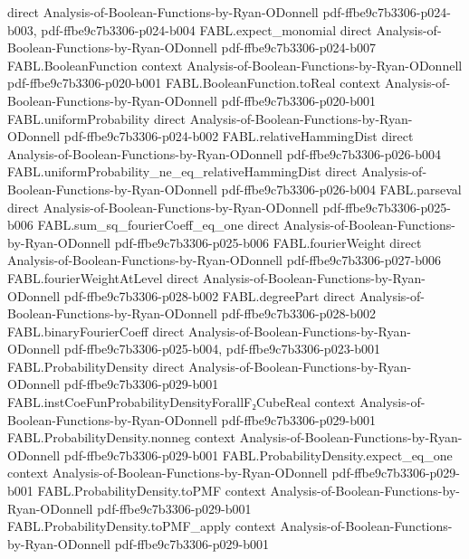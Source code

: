 \begin{theorem}
  {direct}
  {Analysis-of-Boolean-Functions-by-Ryan-ODonnell}
  {pdf-ffbe9c7b3306-p024-b003,
    pdf-ffbe9c7b3306-p024-b004}
\proofstep
  {FABL.expect_monomial}
  {direct}
  {Analysis-of-Boolean-Functions-by-Ryan-ODonnell}
  {pdf-ffbe9c7b3306-p024-b007}
\proofstep
  {FABL.BooleanFunction}
  {context}
  {Analysis-of-Boolean-Functions-by-Ryan-ODonnell}
  {pdf-ffbe9c7b3306-p020-b001}
\proofstep
  {FABL.BooleanFunction.toReal}
  {context}
  {Analysis-of-Boolean-Functions-by-Ryan-ODonnell}
  {pdf-ffbe9c7b3306-p020-b001}
\proofstep
  {FABL.uniformProbability}
  {direct}
  {Analysis-of-Boolean-Functions-by-Ryan-ODonnell}
  {pdf-ffbe9c7b3306-p024-b002}
\proofstep
  {FABL.relativeHammingDist}
  {direct}
  {Analysis-of-Boolean-Functions-by-Ryan-ODonnell}
  {pdf-ffbe9c7b3306-p026-b004}
\proofstep
  {FABL.uniformProbability_ne_eq_relativeHammingDist}
  {direct}
  {Analysis-of-Boolean-Functions-by-Ryan-ODonnell}
  {pdf-ffbe9c7b3306-p026-b004}
\proofstep
  {FABL.parseval}
  {direct}
  {Analysis-of-Boolean-Functions-by-Ryan-ODonnell}
  {pdf-ffbe9c7b3306-p025-b006}
\proofstep
  {FABL.sum_sq_fourierCoeff_eq_one}
  {direct}
  {Analysis-of-Boolean-Functions-by-Ryan-ODonnell}
  {pdf-ffbe9c7b3306-p025-b006}
\proofstep
  {FABL.fourierWeight}
  {direct}
  {Analysis-of-Boolean-Functions-by-Ryan-ODonnell}
  {pdf-ffbe9c7b3306-p027-b006}
\proofstep
  {FABL.fourierWeightAtLevel}
  {direct}
  {Analysis-of-Boolean-Functions-by-Ryan-ODonnell}
  {pdf-ffbe9c7b3306-p028-b002}
\proofstep
  {FABL.degreePart}
  {direct}
  {Analysis-of-Boolean-Functions-by-Ryan-ODonnell}
  {pdf-ffbe9c7b3306-p028-b002}
\proofstep
  {FABL.binaryFourierCoeff}
  {direct}
  {Analysis-of-Boolean-Functions-by-Ryan-ODonnell}
  {pdf-ffbe9c7b3306-p025-b004,
    pdf-ffbe9c7b3306-p023-b001}
\proofstep
  {FABL.ProbabilityDensity}
  {direct}
  {Analysis-of-Boolean-Functions-by-Ryan-ODonnell}
  {pdf-ffbe9c7b3306-p029-b001}
\proofstep
  {FABL.instCoeFunProbabilityDensityForallF₂CubeReal}
  {context}
  {Analysis-of-Boolean-Functions-by-Ryan-ODonnell}
  {pdf-ffbe9c7b3306-p029-b001}
\proofstep
  {FABL.ProbabilityDensity.nonneg}
  {context}
  {Analysis-of-Boolean-Functions-by-Ryan-ODonnell}
  {pdf-ffbe9c7b3306-p029-b001}
\proofstep
  {FABL.ProbabilityDensity.expect_eq_one}
  {context}
  {Analysis-of-Boolean-Functions-by-Ryan-ODonnell}
  {pdf-ffbe9c7b3306-p029-b001}
\proofstep
  {FABL.ProbabilityDensity.toPMF}
  {context}
  {Analysis-of-Boolean-Functions-by-Ryan-ODonnell}
  {pdf-ffbe9c7b3306-p029-b001}
\proofstep
  {FABL.ProbabilityDensity.toPMF_apply}
  {context}
  {Analysis-of-Boolean-Functions-by-Ryan-ODonnell}
  {pdf-ffbe9c7b3306-p029-b001}

\end{theorem}
